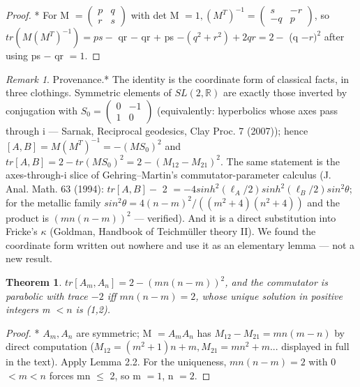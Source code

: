 \documentclass[11pt]{article}
\theoremstyle{plain}
\newtheorem{theorem}{Theorem}[section]
\theoremstyle{definition}
\theoremstyle{remark}
\newtheorem*{remark}{Remark}
\begin{document}
\begin{proof}* For M \(= \left(\begin{smallmatrix}p & q\\r & s\end{smallmatrix}\right)\) with det M \(= 1, (M^{T})^{-1} = \left(\begin{smallmatrix}s & -r\\-q & p\end{smallmatrix}\right)\), so \(tr(M(M^{T})^{-1}) = ps -\) qr \(-\) qr + ps \(- (q^{2} + r^{2}) + 2qr = 2 -\) (q \(- r)^{2}\) after using ps \(-\) qr \(= 1\). \end{proof}

\begin{remark}Provenance.* The identity is the coordinate form of classical facts, in three clothings. Symmetric elements of \(SL(2,\mathbb{R})\) are exactly those inverted by conjugation with \(S_{0} = \left(\begin{smallmatrix}0 & -1\\1 & 0\end{smallmatrix}\right)\) (equivalently: hyperbolics whose axes pass through i — Sarnak, Reciprocal geodesics, Clay Proc. 7 (2007)); hence \([A,B] = M(M^{T})^{-1} = -(MS_{0})^{2}\) and \(tr[A,B] = 2 - tr(MS_{0})^{2} = 2 - (M_{12} - M_{21})^{2}\). The same statement is the axes-through-i slice of Gehring–Martin's commutator-parameter calculus (J. Anal. Math. 63 (1994): \(tr[A,B] -\) 2 \(= -4 sinh^{2}(\ell _{A}/2) sinh^{2}(\ell _{B}/2) sin^{2}\theta \); for the metallic family \(sin^{2}\theta  = 4(n-m)^{2}/((m^{2}+4)(n^{2}+4))\) and the product is \((mn(n-m))^{2}\) — verified). And it is a direct substitution into Fricke's \(\kappa \) (Goldman, Handbook of Teichmüller theory II). We found the coordinate form written out nowhere and use it as an elementary lemma — not a new result.\end{remark}

\begin{theorem}
\(tr[A_{m}, A_{n}] = 2 - (mn(n-m))^{2}\), and the commutator is parabolic with trace \(-2\) iff \(mn(n-m) = 2\), whose unique solution in positive integers m \(< n\) is (1,2).
\end{theorem}

\begin{proof}* \(A_{m}, A_{n}\) are symmetric; M \(= A_{m}A_{n}\) has \(M_{12} - M_{21} = mn(m-n)\) by direct computation (\(M_{12} = (m^{2}+1)n + m, M_{21} = mn^{2} + m\)... displayed in full in the text). Apply Lemma 2.2. For the uniqueness, \(mn(n-m) = 2\) with 0 \(< m < n\) forces mn \(\le \) 2, so m \(= 1\), n \(= 2\). \end{proof}
\end{document}
